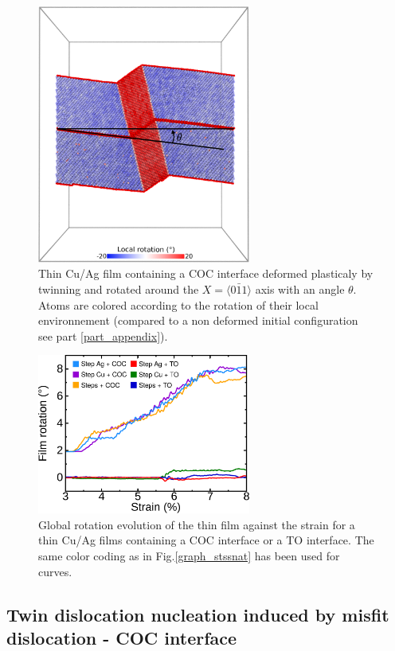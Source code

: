 \documentclass[final,3p,times,twocolumn]{elsarticle}
\begin{document}
\begin{figure}[!h]
	\begin{center}
		\includegraphics[width=70mm]{Pic/graph_res_rot_fig3.eps} 
	\end{center}\caption{Thin Cu/Ag film containing a COC interface deformed plasticaly by twinning and rotated around the $X=\langle0\bar{1}1\rangle$ axis with an angle $\theta$. Atoms are colored according to the rotation of their local environnement (compared to a non deformed initial configuration see part \ref{part_appendix}).}\label{graph_res_rot}
\end{figure}

\begin{figure}[!h]
	\begin{center}
		\includegraphics[width=70mm]{Pic/graph_rotation.eps} 
	\end{center}\caption{Global rotation evolution of the thin film against the strain for a thin Cu/Ag films containing a COC interface or a TO interface. The same color coding as in Fig.\ref{graph_stssnat} has been used for curves.}\label{graph_rotation}
\end{figure}

	\subsection{Twin dislocation nucleation induced by misfit dislocation - COC interface}\label{subsubpart_twin}
	
\end{document}
